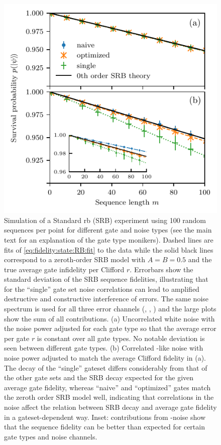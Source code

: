 \begin{figure}[tbp]
    \centering
    \includegraphics{img/RB_naive-optimized-single_gates_white_vs_correl_with_Z_noise_inset.pdf}
    \caption{Simulation of a Standard \gls{rb} (SRB) experiment using \num{100} random sequences per point for different gate and noise types (see the main text for an explanation of the gate type monikers). Dashed lines are fits of \cref{eq:fidelity:state:RB:fit} to the data while the solid black lines correspond to a zeroth-order SRB model with $A=B=\num{0.5}$ and the true average gate infidelity per Clifford $r$. Errorbars show the standard deviation of the SRB sequence fidelities, illustrating that for the \enquote{single} gate set noise correlations can lead to amplified destructive and constructive interference of errors. The same noise spectrum is used for all three error channels (\px, \py, \pz) and the large plots show the sum of all contributions. (a) Uncorrelated white noise with the noise power adjusted for each gate type so that the average error per gate $r$ is constant over all gate types. No notable deviation is seen between different gate types. (b) Correlated \oneoverf-like noise with noise power adjusted to match the average Clifford fidelity in (a). The decay of the \enquote{single} gateset differs considerably from that of the other gate sets and the SRB decay expected for the given average gate fidelity, whereas \enquote{naive} and \enquote{optimized} gates match the zeroth order SRB model well, indicating that correlations in the noise affect the relation between SRB decay and average gate fidelity in a gateset-dependent way. Inset: contributions from \pz-noise show that the sequence fidelity can be better than expected for certain gate types and noise channels.}
    \label{fig:randomized_benchmarking:noise_comparison}
\end{figure}

